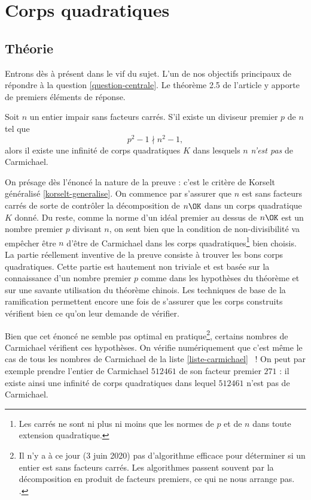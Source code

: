 \section{Corps quadratiques}

\subsection{Théorie}

Entrons dès à présent dans le vif du sujet. L'un de nos objectifs principaux de répondre à la question \ref{question-centrale}. Le théorème 2.5 de l'article y apporte de premiers éléments de réponse.

\begin{theoreme}\label{theoreme-2.5}
	Soit $n$ un entier impair sans facteurs carrés. S'il existe un diviseur premier $p$ de $n$ tel que $$p^2 - 1 \nmid n^2 - 1,$$ alors il existe une infinité de corps quadratiques $K$ dans lesquels $n$ \emph{n'est pas} de Carmichael.
\end{theoreme}

\begin{MotSurPreuve}
	On présage dès l'énoncé la nature de la preuve : c'est le critère de Korselt généralisé \ref{korselt-generalise}. On commence par s'assurer que $n$ est sans facteurs carrés de sorte de contrôler la décomposition de $n\OK$ dans un corps quadratique $K$ donné. Du reste, comme la norme d'un idéal premier au dessus de $n\OK$ est un nombre premier $p$ divisant $n$, on sent bien que la condition de non-divisibilité va empêcher être $n$ d'être de Carmichael dans les corps quadratiques\footnote{Les carrés ne sont ni plus ni moins que les normes de $p$ et de $n$ dans toute extension quadratique.} bien choisis. La partie réellement inventive de la preuve consiste à trouver les bons corps quadratiques. Cette partie est hautement non triviale et est basée sur la connaissance d'un nombre premier $p$ comme dans les hypothèses du théorème et sur une savante utilisation du théorème chinois. Les techniques de base de la ramification permettent encore une fois de s'assurer que les corps construits vérifient bien ce qu'on leur demande de vérifier. \\
\end{MotSurPreuve}

Bien que cet énoncé ne semble pas optimal en pratique\footnote{Il n'y a à ce jour (3 juin 2020) pas d'algorithme efficace pour déterminer si un entier est sans facteurs carrés. Les algorithmes passent souvent par la décomposition en produit de facteurs premiers, ce qui ne nous arrange pas. .}, certains nombres de Carmichael vérifient ces hypothèses. On vérifie numériquement que c'est même le cas de tous les nombres de Carmichael de la liste \ref{liste-carmichael} ~! On peut par exemple prendre l'entier de Carmichael $512461$ de son facteur premier $271$ : il existe ainsi une infinité de corps quadratiques dans lequel $512461$ n'est pas de Carmichael. \\

